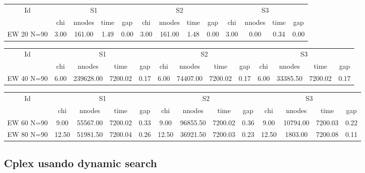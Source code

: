 \begin{sidewaystable}[h] \begin{tabular}{|c|cccc|cccc|cccc|}
\hline
\multicolumn{1}{|c|}{Id} & \multicolumn{4}{|c|}{S1} & \multicolumn{4}{|c|}{S2} & \multicolumn{4}{|c|}{S3}
\\
 & chi & nnodes & time & gap & chi & nnodes & time & gap & chi & nnodes & time & gap
\\
\hline
EW 20 N=90 & 3.00 & 161.00 & 1.49 & 0.00 & 3.00 & 161.00 & 1.48 & 0.00 & 3.00 & 0.00 & 0.34 & 0.00
\\
\hline 
 \end{tabular} 
 
 
 \begin{tabular}{|c|cccc|cccc|cccc|}
\hline
\multicolumn{1}{|c|}{Id} & \multicolumn{4}{|c|}{S1} & \multicolumn{4}{|c|}{S2} & \multicolumn{4}{|c|}{S3}
\\
 & chi & nnodes & time & gap & chi & nnodes & time & gap & chi & nnodes & time & gap
\\
\hline
EW 40 N=90 & 6.00 & 239628.00 & 7200.02 & 0.17 & 6.00 & 74407.00 & 7200.02 & 0.17 & 6.00 & 33385.50 & 7200.02 & 0.17
\\
\hline 
 \end{tabular} 
 
 \begin{tabular}{|c|cccc|cccc|cccc|}
\hline
\multicolumn{1}{|c|}{Id} & \multicolumn{4}{|c|}{S1} & \multicolumn{4}{|c|}{S2} & \multicolumn{4}{|c|}{S3}
\\
 & chi & nnodes & time & gap & chi & nnodes & time & gap & chi & nnodes & time & gap
\\
\hline
EW 60 N=90 & 9.00 & 55567.00 & 7200.02 & 0.33 & 9.00 & 96855.50 & 7200.02 & 0.36 & 9.00 & 10794.00 & 7200.03 & 0.22
\\
EW 80 N=90 & 12.50 & 51981.50 & 7200.04 & 0.26 & 12.50 & 36921.50 & 7200.03 & 0.23 & 12.50 & 1803.00 & 7200.08 & 0.11
\\
\hline 
 \end{tabular} \end{sidewaystable}

\clearpage

\subsection{Cplex usando dynamic search}


